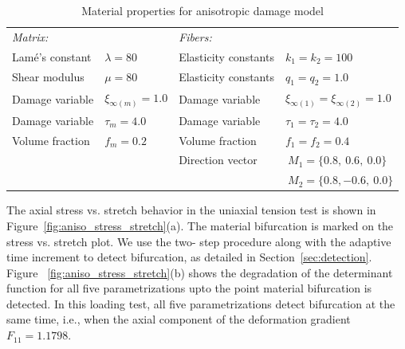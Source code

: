\documentclass[12pt]{article}
\numberwithin{equation}{section}
\begin{document}
\begin{table}[H]
  \begin{center}
    \begin{tabular}{ l l l l }
      \toprule
      \it{Matrix}:
      &

      &

      \it{Fibers}:

      &
      \\
      Lam\'{e}'s constant
      &
      $\lambda=80$
      &
      Elasticity constants
      &
      $k_1 = k_2 = 100$
      \\
      Shear modulus
      &
      $\mu = 80$
      &
      Elasticity constants
      &
      $q_1 = q_2 = 1.0$
      \\
      Damage variable
      &
      $\xi_{\infty(m)} = 1.0$
      &
      Damage variable
      &
      $\xi_{\infty(1)} = \xi_{\infty(2)} = 1.0$
      \\
      Damage variable
      &
      $\tau_m = 4.0$
      &
      Damage variable
      &
      $\tau_1 = \tau_2 = 4.0$
      \\
      Volume fraction
      &
      $f_m = 0.2$
      &
      Volume fraction
      &
      $f_1 = f_2 = 0.4$
      \\
      &

      &
      Direction vector
      &
      $~M_1 = \{ 0.8,~0.6,~0.0\}$
      \\
      &

      &

      &
      $~M_2 = \{ 0.8,-0.6,~0.0\}$
      \\
      \bottomrule
    \end{tabular}
    \caption{Material properties for anisotropic damage model}
    \label{tab:aniso_material}
  \end{center}
\end{table}

The axial stress vs. stretch behavior in the uniaxial tension test is
shown in Figure~\ref{fig:aniso_stress_stretch}(a). The material
bifurcation is marked on the stress vs. stretch plot. We use the two-
step procedure along with the adaptive time increment to detect
bifurcation, as detailed in Section~\ref{sec:detection}. Figure~
\ref{fig:aniso_stress_stretch}(b) shows the degradation of the
determinant function for all five parametrizations upto the point
material bifurcation is detected. In this loading test, all five
parametrizations detect bifurcation at the same time, i.e., when the
axial component of the deformation gradient $F_{11} = 1.1798$.
\end{document}
